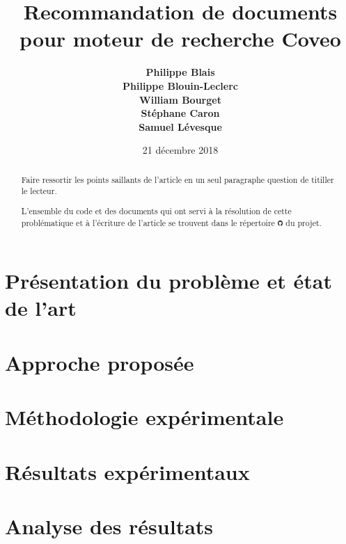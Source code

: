 \documentclass[10pt,letterpaper]{article}
\title{Recommandation de documents pour moteur de recherche Coveo}
\author{{\large \bf Philippe Blais} \\
   {\large \bf Philippe Blouin-Leclerc} \\
   {\large \bf William Bourget} \\
   {\large \bf Stéphane Caron} \\
   {\large \bf Samuel Lévesque}}
\date{21 décembre 2018}
\numberwithin{equation}{section}
\begin{document}
\maketitle

\begin{multicols}{2}

\begin{abstract}
Faire ressortir les points saillants de l'article en un seul paragraphe question de titiller le lecteur. 

L'ensemble du code et des documents qui ont servi à la résolution de cette problématique et à l'écriture de l'article se trouvent dans le répertoire \href{https://github.com/stecaron/projet-gif-7005}{\includegraphics[height=0.2cm]{GitHub-Mark-32px}} du projet.
\end{abstract}


\section{Présentation du problème et état de l'art}




\section{Approche proposée}




\section{Méthodologie expérimentale}




\section{Résultats expérimentaux}




\section{Analyse des résultats}






\setlength{\bibleftmargin}{.125in}
\setlength{\bibindent}{-\bibleftmargin}



\end{multicols}
\end{document}
